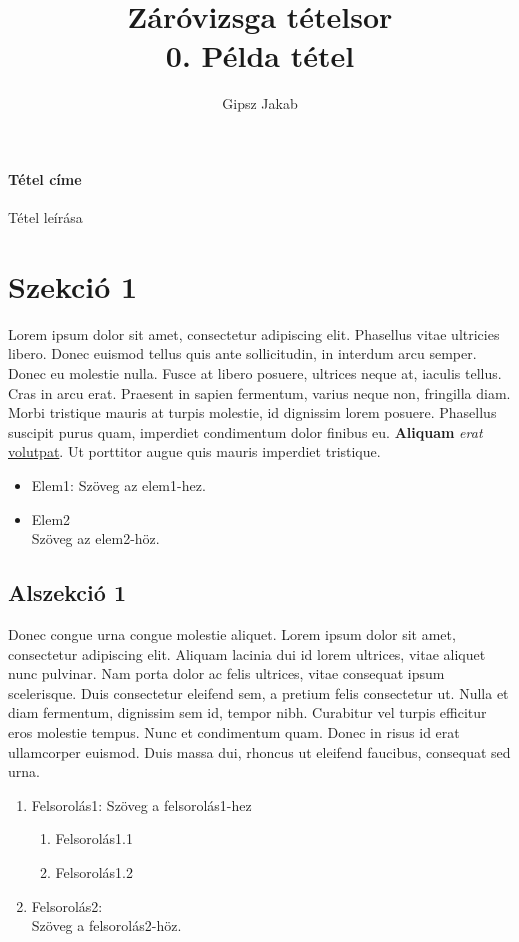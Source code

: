 \documentclass[margin=0px]{article}
\title{Záróvizsga tételsor \\ \large 0. Példa tétel}
\date{}
\author{Gipsz Jakab}
\newenvironment{tetel}[1]{\paragraph{#1 \\}}{}
\begin{document}
	\maketitle
	
	\begin{tetel}{Tétel címe}
			Tétel leírása
	\end{tetel}
	
	
	\section{Szekció 1}
	
	Lorem ipsum dolor sit amet, consectetur adipiscing elit. Phasellus vitae ultricies libero. Donec euismod tellus quis ante sollicitudin, in interdum arcu semper. Donec eu molestie nulla. Fusce at libero posuere, ultrices neque at, iaculis tellus. Cras in arcu erat. Praesent in sapien fermentum, varius neque non, fringilla diam. Morbi tristique mauris at turpis molestie, id dignissim lorem posuere. Phasellus suscipit purus quam, imperdiet condimentum dolor finibus eu. \textbf{Aliquam} \textit{erat} \underline{volutpat}. Ut porttitor augue quis mauris imperdiet tristique.
	\begin{itemize}
		\item Elem1:
			Szöveg az elem1-hez.
		\item Elem2 \\
			Szöveg az elem2-höz.
	\end{itemize}
	
	\subsection{Alszekció 1}
	
	Donec congue urna congue molestie aliquet. Lorem ipsum dolor sit amet, consectetur adipiscing elit. Aliquam lacinia dui id lorem ultrices, vitae aliquet nunc pulvinar. Nam porta dolor ac felis ultrices, vitae consequat ipsum scelerisque. Duis consectetur eleifend sem, a pretium felis consectetur ut. Nulla et diam fermentum, dignissim sem id, tempor nibh. Curabitur vel turpis efficitur eros molestie tempus. Nunc et condimentum quam. Donec in risus id erat ullamcorper euismod. Duis massa dui, rhoncus ut eleifend faucibus, consequat sed urna.
	\begin{enumerate}
		\item Felsorolás1: Szöveg a felsorolás1-hez
		\begin{enumerate}
			\item Felsorolás1.1
			\item Felsorolás1.2
		\end{enumerate}
		\item Felsorolás2: \\
		Szöveg a felsorolás2-höz.
	\end{enumerate}
	
\end{document}
